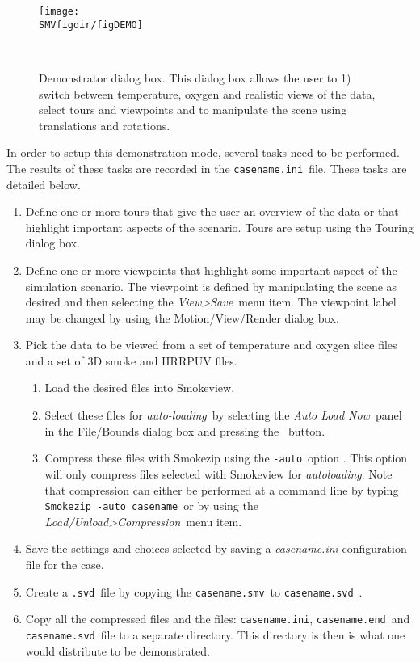 \documentclass[11pt,twoside]{book}
\newcommand{\frameit}[1]{\fbox{\tt #1}}
\begin{document}
\begin{figure}[bph]
\begin{center}
\texttt{[image: \\SMVfigdir/figDEMO]}
\end{center}
\caption[Demonstrator dialog box.]{Demonstrator dialog box.
This dialog box allows the user to 1) switch between temperature,
oxygen and realistic views of the data,
select tours and viewpoints
 and to manipulate the scene using translations and rotations.}\ \label{figDEMO}
\end{figure}

In order to setup this demonstration mode, several tasks need to be performed.
The results of these tasks are
recorded in the {\tt casename.ini}\ file.
These tasks are detailed below.

\begin{enumerate}
  \item Define one or more tours that give the user an overview of the data or that highlight important
  aspects of the scenario.   Tours are setup using the Touring dialog box.
  \item Define one or more viewpoints that highlight some important
  aspect of the simulation scenario.  The viewpoint is defined by manipulating the scene
  as desired and then selecting the {\em View>Save}\ menu item.  The viewpoint label may
  be changed by using the Motion/View/Render dialog box.
  \item Pick the data to be viewed from a set of temperature and oxygen slice files
  and a set of 3D smoke and HRRPUV files.
  \begin{enumerate}
    \item Load the desired files into Smokeview.
    \item Select these files for {\em auto-loading}\ by selecting the {\em Auto Load Now}\ panel
    in the File/Bounds dialog box and pressing the
    \frameit{Save Auto Load File List}\ button.
    \item Compress these files with Smokezip using the {\tt -auto}\ option .
    This option will only compress files selected with Smokeview for {\em autoloading}.
    Note that compression can either be performed at a command line by typing
    {\tt Smokezip -auto casename}\ or by using the {\em Load/Unload>Compression}\ menu item.
      \end{enumerate}
  \item Save the settings and choices selected by saving a {\em casename.ini}
  configuration file for the case.
  \item Create a {\tt .svd}\ file by copying the {\tt casename.smv}\ to {\tt casename.svd}\ .
  \item Copy all the compressed files and the files: {\tt casename.ini}, {\tt casename.end}\ and {\tt casename.svd}\ file to a separate directory.  This directory is then is what one would distribute to be demonstrated.
\end{enumerate}
\end{document}
